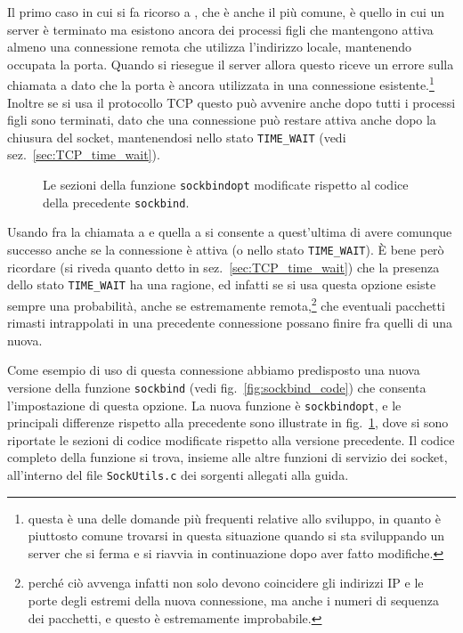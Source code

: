 Il primo caso in cui si fa ricorso a , che è anche il più
comune, è quello in cui un server è terminato ma esistono ancora dei processi
figli che mantengono attiva almeno una connessione remota che utilizza
l'indirizzo locale, mantenendo occupata la porta. Quando si riesegue il server
allora questo riceve un errore sulla chiamata a  dato che la porta
è ancora utilizzata in una connessione esistente.\footnote{questa è una delle
  domande più frequenti relative allo sviluppo, in quanto è piuttosto comune
  trovarsi in questa situazione quando si sta sviluppando un server che si
  ferma e si riavvia in continuazione dopo aver fatto modifiche.}  Inoltre se
si usa il protocollo TCP questo può avvenire anche dopo tutti i processi figli
sono terminati, dato che una connessione può restare attiva anche dopo la
chiusura del socket, mantenendosi nello stato \texttt{TIME\_WAIT} (vedi
sez.~\ref{sec:TCP_time_wait}).

\begin{figure}[!htbp]
  \footnotesize \centering
  \begin{minipage}[c]{\codesamplewidth}
  \end{minipage}
  \normalsize
  \caption{Le sezioni della funzione \texttt{sockbindopt} modificate rispetto al
    codice della precedente \texttt{sockbind}.} 
  \label{fig:sockbindopt_code}
\end{figure}

Usando  fra la chiamata a  e quella a
 si consente a quest'ultima di avere comunque successo anche se la
connessione è attiva (o nello stato \texttt{TIME\_WAIT}). È bene però
ricordare (si riveda quanto detto in sez.~\ref{sec:TCP_time_wait}) che la
presenza dello stato \texttt{TIME\_WAIT} ha una ragione, ed infatti se si usa
questa opzione esiste sempre una probabilità, anche se estremamente
remota,\footnote{perché ciò avvenga infatti non solo devono coincidere gli
  indirizzi IP e le porte degli estremi della nuova connessione, ma anche i
  numeri di sequenza dei pacchetti, e questo è estremamente improbabile.}  che
eventuali pacchetti rimasti intrappolati in una precedente connessione possano
finire fra quelli di una nuova.

Come esempio di uso di questa connessione abbiamo predisposto una nuova
versione della funzione \texttt{sockbind} (vedi fig.~\ref{fig:sockbind_code})
che consenta l'impostazione di questa opzione. La nuova funzione è
\texttt{sockbindopt}, e le principali differenze rispetto alla precedente sono
illustrate in fig.~\ref{fig:sockbindopt_code}, dove si sono riportate le
sezioni di codice modificate rispetto alla versione precedente. Il codice
completo della funzione si trova, insieme alle altre funzioni di servizio dei
socket, all'interno del file \texttt{SockUtils.c} dei sorgenti allegati alla
guida.

